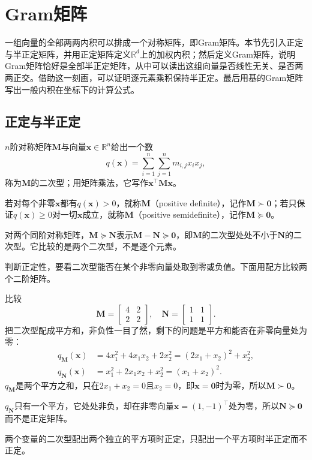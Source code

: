 
\section{Gram矩阵}
\label{sec:ls-gram-psd}

一组向量的全部两两内积可以排成一个对称矩阵，即Gram矩阵。本节先引入正定与半正定矩阵，并用正定矩阵定义$\mathbb R^d$上的加权内积；然后定义Gram矩阵，说明Gram矩阵恰好是全部半正定矩阵，从中可以读出这组向量是否线性无关、是否两两正交。借助这一刻画，可以证明逐元素乘积保持半正定。最后用基的Gram矩阵写出一般内积在坐标下的计算公式。

\subsection{正定与半正定}
\label{sec:ls-positive-definite}
$n$阶对称矩阵$\bm M$与向量$\bm x\in\mathbb R^n$给出一个数
\begin{equation}
 q(\bm x)=\sum_{i=1}^n\sum_{j=1}^n m_{i,j}x_ix_j,
 \label{eq:ls-quadratic-form}
\end{equation}
称为$\bm M$的二次型；用矩阵乘法，它写作$\bm x^\top\bm M\bm x$。

若对每个非零$\bm x$都有$q(\bm x)>0$，就称$\bm M$（positive definite），记作$\bm M\succ\bm0$；若只保证$q(\bm x)\geq0$对一切$\bm x$成立，就称$\bm M$（positive semidefinite），记作$\bm M\succeq\bm0$。

对两个同阶对称矩阵，$\bm M\succeq\bm N$表示$\bm M-\bm N\succeq\bm0$，即$\bm M$的二次型处处不小于$\bm N$的二次型。它比较的是两个二次型，不是逐个元素。

判断正定性，要看二次型能否在某个非零向量处取到零或负值。下面用配方比较两个二阶矩阵。
\begin{example}[用配方区分正定与半正定]
\label{ex:ls-pd-psd-completing-square}
比较
\[
 \bm M=\begin{bmatrix}4&2\\2&2\end{bmatrix},\quad
 \bm N=\begin{bmatrix}1&1\\1&1\end{bmatrix}.
\]
把二次型配成平方和，非负性一目了然，剩下的问题是平方和能否在非零向量处为零：
\[
 \begin{aligned}
 q_{\bm M}(\bm x)&=4x_1^2+4x_1x_2+2x_2^2=(2x_1+x_2)^2+x_2^2,\\
 q_{\bm N}(\bm x)&=x_1^2+2x_1x_2+x_2^2=(x_1+x_2)^2.
 \end{aligned}
\]
$q_{\bm M}$是两个平方之和，只在$2x_1+x_2=0$且$x_2=0$，即$\bm x=\bm0$时为零，所以$\bm M\succ\bm0$。

$q_{\bm N}$只有一个平方，它处处非负，却在非零向量$\bm x=(1,-1)^\top$处为零，所以$\bm N\succeq\bm0$而不是正定矩阵。

两个变量的二次型配出两个独立的平方项时正定，只配出一个平方项时半正定而不正定。
\end{example}

